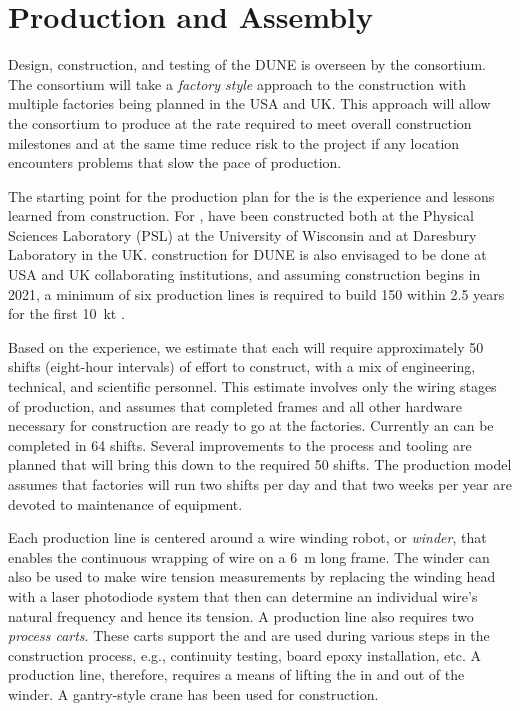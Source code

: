 \section{Production and Assembly}
\label{sec:fdsp-apa-prod-assy}

Design, construction, and testing of the DUNE   is overseen by the  consortium. %
The  consortium will take a \textit{factory style} approach to the construction with multiple factories being planned in the USA and UK. This approach will allow the consortium to produce  at the rate required to meet overall construction milestones and at the same time reduce risk to the project if any location encounters problems that slow the pace of production.

The starting point for the  production plan for the  is the experience and lessons learned from  construction. For ,  have been constructed both at the Physical Sciences Laboratory (PSL) at the University of Wisconsin and at Daresbury Laboratory in the UK.   construction for DUNE is also envisaged to be done at USA and UK collaborating institutions, and assuming construction begins in 2021, a minimum of six production lines is required to build \num{150}  within \num{2.5} years for the first %
\SI{10}{kt} .   

Based on the  experience, we estimate that each  will require approximately \num{50} shifts (eight-hour intervals) of effort to construct, with a mix of engineering, technical, and scientific personnel. This estimate involves only the wiring stages of production, and assumes that completed frames and all other hardware necessary for construction are ready to go at the factories. Currently an  can be completed in \num{64} shifts. Several improvements to the process and tooling are planned that will bring this down to the required \num{50} shifts. The production model assumes that factories will run two shifts per day and that two weeks per year are devoted to maintenance of equipment. 

Each production line is centered around a wire winding robot, or \textit{winder}, that enables the continuous wrapping of wire on a \SI{6}{m} long frame. The winder can also be used to make wire tension measurements by replacing the winding head with a laser photodiode system that then can determine an individual wire's natural frequency and hence its tension. A production line also requires two \textit{process carts}. These carts support the  and are used during various steps in the construction process, e.g., continuity testing, board epoxy installation, etc. A production line, therefore, requires a means of lifting the  in and out of the winder. A gantry-style crane has been used for  construction.

